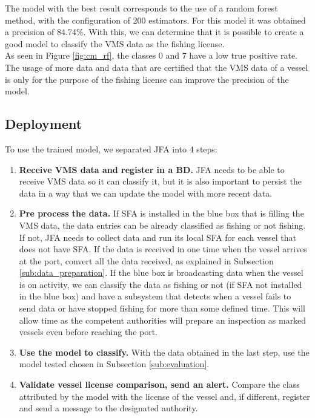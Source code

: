 \newpage


The model with the best result corresponds to the use of a random forest method, with the configuration of 200 estimators. For this model it was obtained a precision of 84.74\%.
With this, we can determine that it is possible to create a good model to classify the VMS data as the fishing license. \\
As seen in Figure \ref{fig:cm_rf}, the classes 0 and 7 have a low true positive rate. The usage of more data and data that are certified that the VMS data of a vessel is only for the purpose of the fishing license can improve the precision of the model.





\subsection{Deployment} %
\label{sub:deployment}

To use the trained model, we separated JFA into 4 steps:
\begin{enumerate}
\item \textbf{ Receive VMS data and register in a BD.} JFA needs to be able to receive VMS data so it can classify it, but it is also important to persist the data in a way that we can update the model with more recent data. 

\item \textbf{Pre process the data.} If SFA is installed in the blue box that is filling the VMS data, the data entries can be already classified as fishing or not fishing. If not, JFA needs to collect data and run its local SFA for each vessel that does not have SFA. If the data is received in one time when the vessel arrives at the port, convert all the data received, as explained in Subsection \ref{sub:data_preparation}. If the blue box is broadcasting data when the vessel is on activity, we can classify the data as fishing or not (if SFA not installed in the blue box) and have a subsystem that detects when a vessel fails to send data or have stopped fishing for more than some defined time. This will allow time as the competent authorities will prepare an inspection as marked vessels even before reaching the port.

\item \textbf{Use the model to classify.} With the data obtained in the last step, use the model tested chosen in Subsection \ref{sub:evaluation}.

\item \textbf{Validate vessel license comparison, send an alert.} Compare the class attributed by the model with the license of the vessel and, if different, register and send a message to the designated authority.

\end{enumerate}

